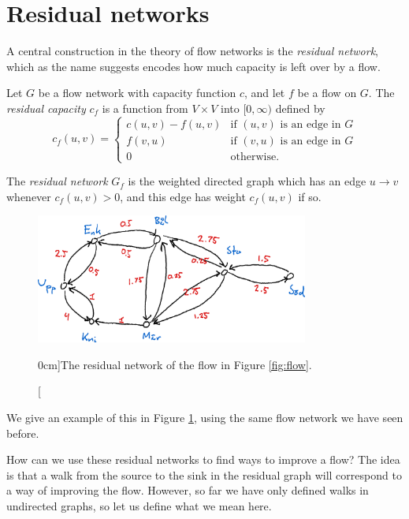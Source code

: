 \documentclass[nobib]{tufte-handout}
\begin{document}
\section{Residual networks}

A central construction in the theory of flow networks is the \emph{residual network}, which as the name suggests encodes how much capacity is left over by a flow.

\begin{definition}
    Let $G$ be a flow network with capacity function $c$, and let $f$ be a flow on $G$. The \emph{residual capacity} $c_f$ is a function from $V\times V$ into $[0,\infty)$ defined by
    $$c_f(u,v) = \begin{cases}
        c(u,v) - f(u,v)&\text{if }(u,v)\text{ is an edge in }G\\
        f(v,u)&\text{if }(v,u)\text{ is an edge in }G\\
        0&\text{otherwise.}
    \end{cases}$$
    
    The \emph{residual network} $G_f$ is the weighted directed graph which has an edge $u \to v$ whenever $c_f(u,v) > 0$, and this edge has weight $c_f(u,v)$ if so.

    \begin{figure}
        \centering
        \includegraphics[width=0.8\textwidth]{graphics/L7_flows/residual_network.png}
        \caption[][0cm]{The residual network of the flow in Figure \ref{fig:flow}.}
        \label{fig:residual_network}
    \end{figure}

    We give an example of this in Figure \ref{fig:residual_network}, using the same flow network we have seen before.
\end{definition}

How can we use these residual networks to find ways to improve a flow? The idea is that a walk from the source to the sink in the residual graph will correspond to a way of improving the flow. However, so far we have only defined walks in undirected graphs, so let us define what we mean here.
\end{document}
